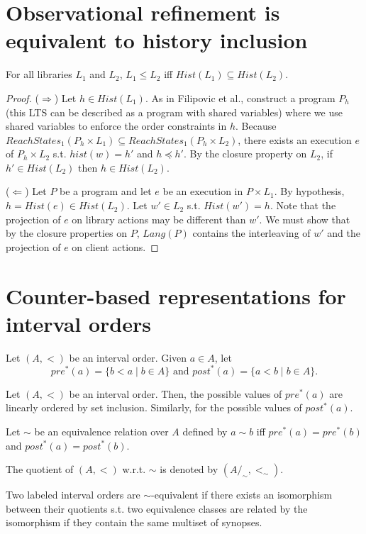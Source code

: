 \section{Observational refinement is equivalent to history inclusion}

\begin{theorem}
For all libraries $L_1$ and $L_2$, 
$L_1 \leq L_2$ iff $Hist(L_1) \subseteq Hist(L_2)$.
\end{theorem}
\begin{proof}
($\Rightarrow$) Let $h\in Hist(L_1)$. As in Filipovic et al., construct a program $P_h$ (this LTS can be described as a program with shared variables) where we use shared variables to enforce the order constraints in $h$. Because $ReachStates_1(P_h\times L_1) \subseteq ReachStates_1(P_h\times L_2)$, there exists an execution $e$ of $P_h\times L_2$ s.t. $hist(w)=h'$ and $h\preceq h'$. By the closure property on $L_2$, if $h'\in Hist(L_2)$ then $h\in Hist(L_2)$. 

($\Leftarrow$) Let $P$ be a program and let $e$ be an execution in $P\times L_1$. By hypothesis, $h=Hist(e)\in Hist(L_2)$. Let $w'\in L_2$ s.t. $Hist(w')=h$. Note that the projection of $e$ on library actions may be different than $w'$. We must show that by the closure properties on $P$, $Lang(P)$ contains the interleaving of $w'$ and the projection of $e$ on client actions.
\end{proof}

\section{Counter-based representations for interval orders}

Let $(A,<)$ be an interval order.
Given $a\in A$, let 
\[
pre^*(a)=\{b < a\mid b\in A\}\mbox{ and }post^*(a)=\{a < b\mid b\in A\}.
\]

\begin{lemma}
Let $(A,<)$ be an interval order. Then, the possible values of $pre^*(a)$ are linearly ordered by set inclusion. Similarly, for the possible values of $post^*(a)$.
\end{lemma}

Let $\sim$ be an equivalence relation over $A$ defined by $a\sim b$ iff $pre^*(a)=pre^*(b)$ and $post^*(a)=post^*(b)$.

The quotient of $(A,<)$ w.r.t. $\sim$ is denoted by $(A/_\sim,<_\sim)$.

Two labeled interval orders are $\sim$-equivalent if there exists an isomorphism between their quotients s.t. two equivalence classes are related by the isomorphism if they contain the same multiset of synopses. 


